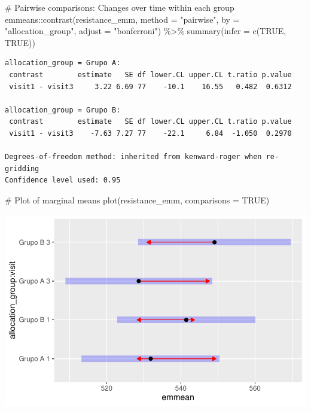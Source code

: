 \documentclass[
  letterpaper,
  DIV=11,
  numbers=noendperiod]{scrartcl}
\newenvironment{Shaded}{\begin{snugshade}}{\end{snugshade}}
\newcommand{\AttributeTok}[1]{\textcolor[rgb]{0.40,0.45,0.13}{#1}}
\newcommand{\CommentTok}[1]{\textcolor[rgb]{0.37,0.37,0.37}{#1}}
\newcommand{\ConstantTok}[1]{\textcolor[rgb]{0.56,0.35,0.01}{#1}}
\newcommand{\FunctionTok}[1]{\textcolor[rgb]{0.28,0.35,0.67}{#1}}
\newcommand{\NormalTok}[1]{\textcolor[rgb]{0.00,0.23,0.31}{#1}}
\newcommand{\SpecialCharTok}[1]{\textcolor[rgb]{0.37,0.37,0.37}{#1}}
\newcommand{\StringTok}[1]{\textcolor[rgb]{0.13,0.47,0.30}{#1}}
\begin{document}
\begin{Shaded}
\begin{Highlighting}[]
\CommentTok{\# Pairwise comparisons: Changes over time within each group}
\NormalTok{emmeans}\SpecialCharTok{::}\FunctionTok{contrast}\NormalTok{(resistance\_emm, }\AttributeTok{method =} \StringTok{"pairwise"}\NormalTok{, }\AttributeTok{by =} \StringTok{"allocation\_group"}\NormalTok{, }\AttributeTok{adjust =} \StringTok{"bonferroni"}\NormalTok{) }\SpecialCharTok{\%\textgreater{}\%} \FunctionTok{summary}\NormalTok{(}\AttributeTok{infer =} \FunctionTok{c}\NormalTok{(}\ConstantTok{TRUE}\NormalTok{, }\ConstantTok{TRUE}\NormalTok{))}
\end{Highlighting}
\end{Shaded}

\begin{verbatim}
allocation_group = Grupo A:
 contrast        estimate   SE df lower.CL upper.CL t.ratio p.value
 visit1 - visit3     3.22 6.69 77    -10.1    16.55   0.482  0.6312

allocation_group = Grupo B:
 contrast        estimate   SE df lower.CL upper.CL t.ratio p.value
 visit1 - visit3    -7.63 7.27 77    -22.1     6.84  -1.050  0.2970

Degrees-of-freedom method: inherited from kenward-roger when re-gridding 
Confidence level used: 0.95 
\end{verbatim}

\begin{Shaded}
\begin{Highlighting}[]
\CommentTok{\# Plot of marginal means}
\FunctionTok{plot}\NormalTok{(resistance\_emm, }\AttributeTok{comparisons =} \ConstantTok{TRUE}\NormalTok{)}
\end{Highlighting}
\end{Shaded}

\includegraphics{Outcomes_V1V2V3_files/figure-pdf/resistance_sens_emm-1.pdf}
\end{document}
